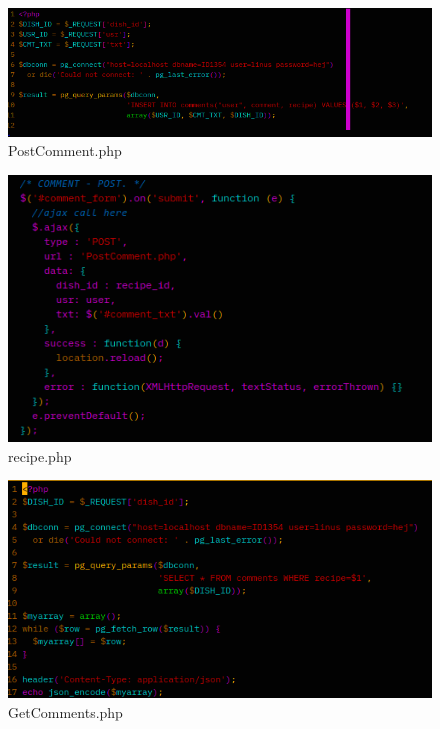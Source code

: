 \documentclass[a4paper]{scrartcl}
\begin{document}
\begin{figure}[H]
  \begin{center}
    \includegraphics[scale=0.9]{images/cmt_code_post_ajax.png}
    \caption{PostComment.php}
    \label{fig:cmt_post_ajax}
  \end{center}
\end{figure}

\begin{figure}[H]
  \begin{center}
    \includegraphics[scale=0.9]{images/cmt_code.png}
    \caption{recipe.php}
    \label{fig:cmt_recipe}
  \end{center}
\end{figure}

\begin{figure}[H]
  \begin{center}
    \includegraphics[scale=0.9]{images/cmt_get.png}
    \caption{GetComments.php}
    \label{fig:cmt_get}
  \end{center}
\end{figure}
\end{document}
